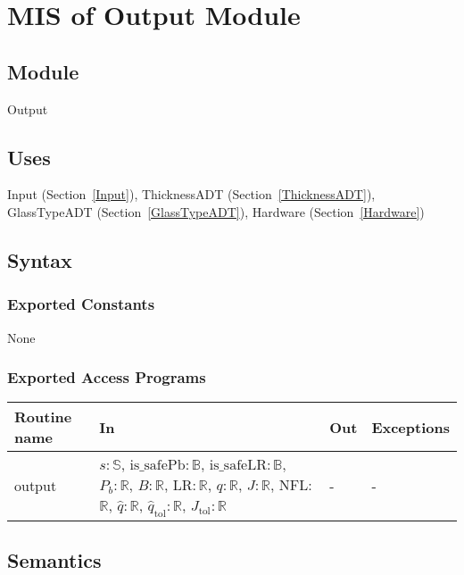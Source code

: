 \documentclass[12pt, titlepage]{article}
\begin{document}
\newpage


\section{MIS of Output Module} \label{Output}

\subsection {Module}

Output

\subsection {Uses}

Input (Section~\ref{Input}), ThicknessADT (Section~\ref{ThicknessADT}),
GlassTypeADT (Section~\ref{GlassTypeADT}), Hardware (Section~\ref{Hardware})

\subsection {Syntax}

\subsubsection {Exported Constants}

None

\subsubsection {Exported Access Programs}

\begin{tabular}{| l | p{10cm} | l | l |}
\hline
\textbf{Routine name} & \textbf{In} & \textbf{Out} & \textbf{Exceptions}\\
\hline
output & $s: \mathbb{S}$, $\mbox{is\_safePb}: \mathbb{B}$,
         $\mbox{is\_safeLR}: \mathbb{B}$, $P_b: \mathbb{R}$, $B: \mathbb{R}$, LR$: \mathbb{R}$, $q:
         \mathbb{R}$,  $J: \mathbb{R}$, NFL: $\mathbb{R}$, $\hat{q}: \mathbb{R}$,
         $\hat{q}_{\text{tol}}: \mathbb{R}$, $J_{\text{tol}}: \mathbb{R}$ & - & -\\
\hline
\end{tabular}

\subsection {Semantics}
\end{document}
